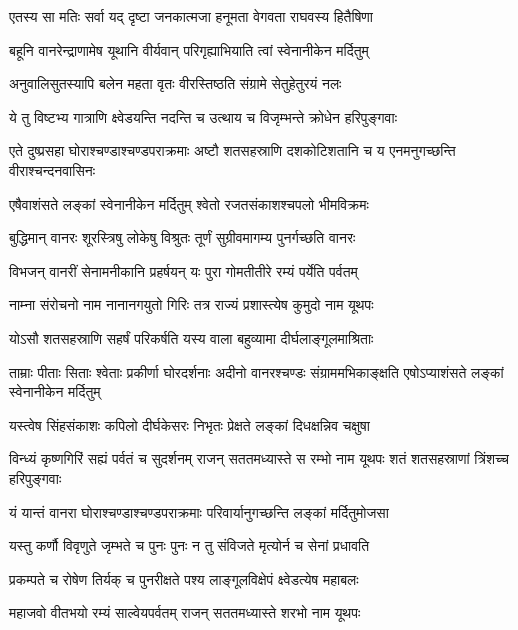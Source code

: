 \twolineshloka
{एतस्य सा मतिः सर्वा यद् दृष्टा जनकात्मजा}
{हनूमता वेगवता राघवस्य हितैषिणा} %

\twolineshloka
{बहूनि वानरेन्द्राणामेष यूथानि वीर्यवान्}
{परिगृह्याभियाति त्वां स्वेनानीकेन मर्दितुम्} %

\twolineshloka
{अनुवालिसुतस्यापि बलेन महता वृतः}
{वीरस्तिष्ठति संग्रामे सेतुहेतुरयं नलः} %

\twolineshloka
{ये तु विष्टभ्य गात्राणि क्ष्वेडयन्ति नदन्ति च}
{उत्थाय च विजृम्भन्ते क्रोधेन हरिपुङ्गवाः} %

\threelineshloka
{एते दुष्प्रसहा घोराश्चण्डाश्चण्डपराक्रमाः}
{अष्टौ शतसहस्राणि दशकोटिशतानि च}
{य एनमनुगच्छन्ति वीराश्चन्दनवासिनः} %

\twolineshloka
{एषैवाशंसते लङ्कां स्वेनानीकेन मर्दितुम्}
{श्वेतो रजतसंकाशश्चपलो भीमविक्रमः} %

\twolineshloka
{बुद्धिमान् वानरः शूरस्त्रिषु लोकेषु विश्रुतः}
{तूर्णं सुग्रीवमागम्य पुनर्गच्छति वानरः} %

\twolineshloka
{विभजन् वानरीं सेनामनीकानि प्रहर्षयन्}
{यः पुरा गोमतीतीरे रम्यं पर्येति पर्वतम्} %

\twolineshloka
{नाम्ना संरोचनो नाम नानानगयुतो गिरिः}
{तत्र राज्यं प्रशास्त्येष कुमुदो नाम यूथपः} %

\twolineshloka
{योऽसौ शतसहस्राणि सहर्षं परिकर्षति}
{यस्य वाला बहुव्यामा दीर्घलाङ्गूलमाश्रिताः} %

\threelineshloka
{ताम्राः पीताः सिताः श्वेताः प्रकीर्णा घोरदर्शनाः}
{अदीनो वानरश्चण्डः संग्राममभिकाङ्क्षति}
{एषोऽप्याशंसते लङ्कां स्वेनानीकेन मर्दितुम्} %

\twolineshloka
{यस्त्वेष सिंहसंकाशः कपिलो दीर्घकेसरः}
{निभृतः प्रेक्षते लङ्कां दिधक्षन्निव चक्षुषा} %

\threelineshloka
{विन्ध्यं कृष्णगिरिं सह्यं पर्वतं च सुदर्शनम्}
{राजन् सततमध्यास्ते स रम्भो नाम यूथपः}
{शतं शतसहस्राणां त्रिंशच्च हरिपुङ्गवाः} %

\twolineshloka
{यं यान्तं वानरा घोराश्चण्डाश्चण्डपराक्रमाः}
{परिवार्यानुगच्छन्ति लङ्कां मर्दितुमोजसा} %

\twolineshloka
{यस्तु कर्णौ विवृणुते जृम्भते च पुनः पुनः}
{न तु संविजते मृत्योर्न च सेनां प्रधावति} %

\twolineshloka
{प्रकम्पते च रोषेण तिर्यक् च पुनरीक्षते}
{पश्य लाङ्गूलविक्षेपं क्ष्वेडत्येष महाबलः} %

\twolineshloka
{महाजवो वीतभयो रम्यं साल्वेयपर्वतम्}
{राजन् सततमध्यास्ते शरभो नाम यूथपः} %


